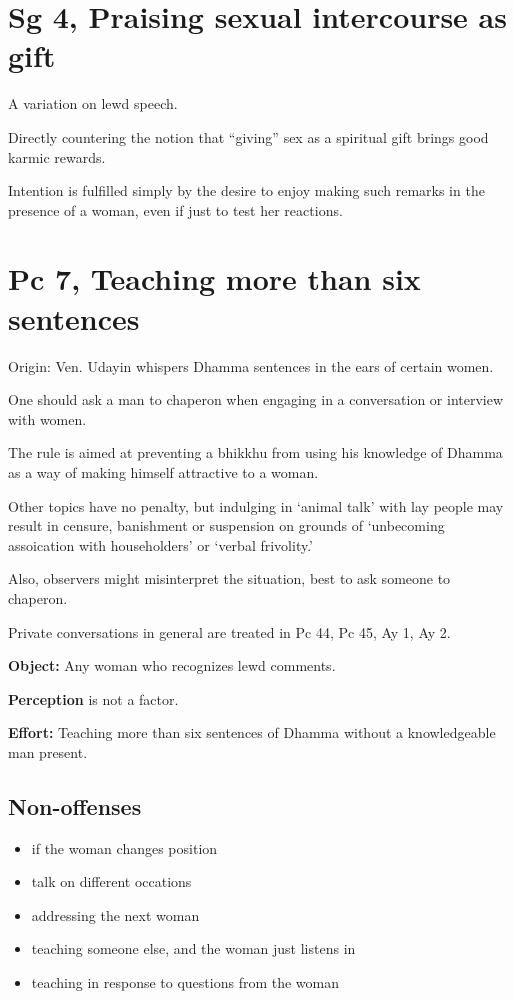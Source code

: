 \section{Sg 4, Praising sexual intercourse as gift}

A variation on lewd speech.

Directly countering the notion that ``giving'' sex as a spiritual gift
brings good karmic rewards.

Intention is fulfilled simply by the desire to enjoy making such remarks
in the presence of a woman, even if just to test her reactions.

\section{Pc 7, Teaching more than six sentences}

\begin{multicols}{2}

Origin: Ven. Udayin whispers Dhamma sentences in the ears of certain
women.

One should ask a man to chaperon when engaging in a conversation or
interview with women.

The rule is aimed at preventing a bhikkhu from using his knowledge of
Dhamma as a way of making himself attractive to a woman.

Other topics have no penalty, but indulging in `animal talk' with lay
people may result in censure, banishment or suspension on grounds of
`unbecoming assoication with householders' or `verbal frivolity.'

Also, observers might misinterpret the situation, best to ask someone to
chaperon.

Private conversations in general are treated in Pc 44, Pc 45, Ay 1, Ay
2.

\textbf{Object:} Any woman who recognizes lewd comments.

\textbf{Perception} is not a factor.

\textbf{Effort:} Teaching more than six sentences of Dhamma without a
knowledgeable man present.

\subsection{Non-offenses}

\begin{itemize}
\tightlist
\item
  if the woman changes position
\item
  talk on different occations
\item
  addressing the next woman
\item
  teaching someone else, and the woman just listens in
\item
  teaching in response to questions from the woman
\end{itemize}

\end{multicols}

